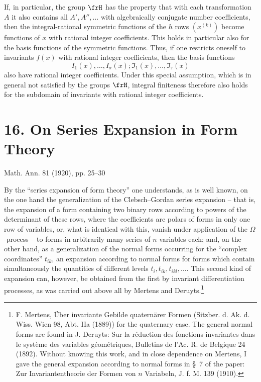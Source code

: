 \documentclass[11pt]{article}
\begin{document}
If, in particular, the group \(\frH\) has the property that with each transformation \(A\) it also contains all \(A',A'',\ldots\) with algebraically conjugate number coefficients, then the integral-rational symmetric functions of the \(h\) rows \((x^{(k)})\) become functions of \(x\) with rational integer coefficients. This holds in particular also for the basis functions of the symmetric functions. Thus, if one restricts oneself to invariants \(f(x)\) with rational integer coefficients, then the basis functions
\[
        I_1(x),\ldots,I_\sigma(x);\mathfrak I_1(x),\ldots,\mathfrak I_\tau(x)
\]
also have rational integer coefficients. Under this special assumption, which is in general not satisfied by the groups \(\frH\), integral finiteness therefore also holds for the subdomain of invariants with rational integer coefficients.




\section*{16. On Series Expansion in Form Theory}
\begin{center}
Math. Ann. 81 (1920), pp. 25--30
\end{center}

By the ``series expansion of form theory'' one understands, as is well known, on the one hand the generalization of the Clebsch--Gordan series expansion -- that is, the expansion of a form containing two binary rows according to powers of the determinant of these rows, where the coefficients are polars of forms in only one row of variables, or, what is identical with this, vanish under application of the $\Omega$-process -- to forms in arbitrarily many series of $n$ variables each; and, on the other hand, as a generalization of the normal forms occurring for the ``complex coordinates'' $t_{ik}$, an expansion according to normal forms for forms which contain simultaneously the quantities of different levels $t_i,t_{ik},t_{ikl},\ldots$. This second kind of expansion can, however, be obtained from the first by invariant differentiation processes, as was carried out above all by Mertens and Deruyts.\footnote{F. Mertens, Über invariante Gebilde quaternärer Formen (Sitzber. d. Ak. d. Wiss. Wien 98, Abt. IIa (1889)) for the quaternary case. The general normal forms are found in J. Deruyts: Sur la réduction des fonctions invariantes dans le système des variables géométriques, Bulletins de l'Ac. R. de Belgique 24 (1892). Without knowing this work, and in close dependence on Mertens, I gave the general expansion according to normal forms in \S~7 of the paper: Zur Invariantentheorie der Formen von $n$ Variabeln, J. f. M. 139 (1910).}
\end{document}
